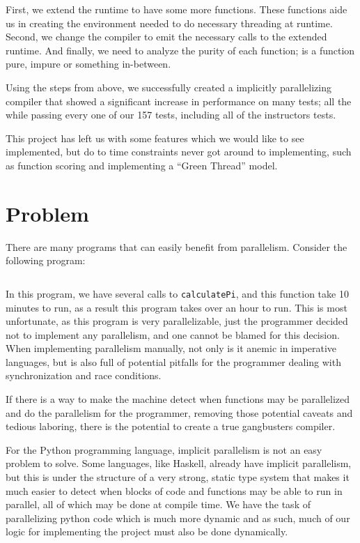 \documentclass{acm_proc_article-sp}
\begin{document}
First, we extend the runtime to have some more functions. These functions aide us in creating
the environment needed to do necessary threading at runtime. Second, we change the compiler to
emit the necessary calls to the extended runtime. And finally, we need to analyze the purity
of each function; is a function pure, impure or something in-between.

Using the steps from above, we successfully created a implicitly parallelizing compiler that
showed a significant increase in performance on many tests; all the while passing every
one of our 157 tests, including all of the instructors tests.

This project has left us with some features which we would like to see implemented, but do to
time constraints never got around to implementing, such as function scoring and implementing
a ``Green Thread'' model.

\section*{Problem}

There are many programs that can easily benefit from parallelism.
Consider the following program:

\inputminted{python}{pi.py}

In this program, we have several calls to \verb|calculatePi|, and this
function take 10 minutes to run, as a result this program takes over an hour
to run. This is most unfortunate, as this program is very parallelizable, just
the programmer decided not to implement any parallelism, and one cannot be blamed
for this decision. When implementing parallelism manually, not only is it anemic
in imperative languages, but is also full of potential pitfalls for the programmer
dealing with synchronization and race conditions.

If there is a way to make the machine detect when functions may be
parallelized and do the parallelism for the programmer, removing those potential
caveats and tedious laboring, there is the potential to create a true gangbusters
compiler.

For the Python programming language, implicit parallelism is not an easy
problem to solve. Some languages, like Haskell, already have implicit
parallelism, but this is under the structure of a very strong, static type
system that makes it much easier to detect when blocks of code and functions
may be able to run in parallel, all of which may be done at compile time. We
have the task of parallelizing python code which is much more dynamic and as
such, much of our logic for implementing the project must also be done
dynamically.
\end{document}

